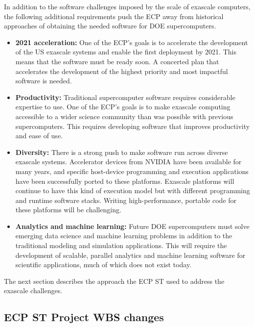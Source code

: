 In addition to the software challenges imposed by the scale of exascale computers, the following additional requirements push the ECP away from historical approaches of obtaining the needed software for DOE supercomputers.
\begin{itemize}
\item \textbf{2021 acceleration:} One of the ECP's goals is to accelerate the development of the US exascale systems and enable the first deployment by 2021. This means that the software must be ready soon. A concerted plan that accelerates the development of the highest priority and most impactful software is needed.
\item \textbf{Productivity:} Traditional supercomputer software requires considerable expertise to use. One of the ECP's goals is to make exascale computing accessible to a wider science community than was possible with previous supercomputers. This requires developing software that improves productivity and ease of use.
\item \textbf{Diversity:} There is a strong push to make software run across diverse exascale systems. Accelerator devices from NVIDIA have been available for many years, and specific host-device programming and execution applications have been successfully ported to these platforms.  Exascale platforms will continue to have this kind of execution model but with different programming and runtime software stacks.  Writing high-performance, portable code for these platforms will be challenging.
\item \textbf{Analytics and machine learning:} Future DOE supercomputers must solve emerging data science and machine learning problems in addition to the traditional modeling and simulation applications. This will require the development of scalable, parallel analytics and machine learning software for scientific applications, much of which does not exist today.
\end{itemize}
 
\noindent The next section describes the approach the ECP ST used to address the exascale challenges.

\subsection{ECP ST Project WBS changes}\label{subsect:ProjectRestructuring}

